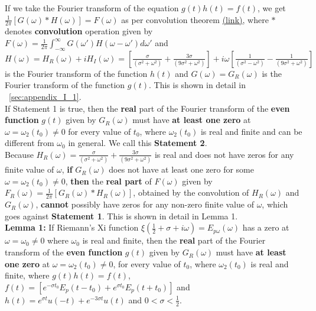 \documentclass[11pt]{elsarticle}
\begin{document}
If we take the Fourier transform of the equation $g(t)  h(t) = f(t)$, we get $ \frac{1}{2 \pi}  [ G(\omega) \ast H(\omega)] = F(\omega)$ as per convolution theorem \href{https://mathworld.wolfram.com/ConvolutionTheorem.html}{(link)}, where $\ast$ denotes \textbf{convolution} operation given by $F(\omega) =  \frac{1}{2 \pi} \int_{-\infty}^{\infty} G(\omega') H(\omega - \omega') d\omega'$ and $H(\omega)=  H_{R}(\omega) + i H_{I}(\omega) = [ \frac{\sigma}{(\sigma^{2} + \omega^{2})} + \frac{3 \sigma}{(9 \sigma^{2} + \omega^{2})} ] + i \omega [ \frac{1}{(\sigma^{2} - \omega^{2})} - \frac{1}{(9 \sigma^{2} + \omega^{2})}  ]  $ is the Fourier transform of the function $h(t)$ and $G(\omega)=  G_{R}(\omega) $ is the Fourier transform of the function $g(t)$. This is shown in detail in ~\ref{sec:appendix_I_1}. \\


If Statement 1 is true, then the \textbf{real} part of the Fourier transform of the \textbf{even function} $g(t)$  given by $G_{R}(\omega)$ must have \textbf{at least one zero} at $\omega = \omega_{2}(t_0) \neq 0$ for every value of $t_0$, where $\omega_{2}(t_0)$ is real and finite and can be different from $\omega_0$ in general. We call this \textbf{Statement 2}. \\

Because $H_R(\omega) = \frac{\sigma}{(\sigma^{2} + \omega^{2})} + \frac{3 \sigma}{(9 \sigma^{2} + \omega^{2})}$ is real and does not have zeros for any finite value of $\omega$, \textbf{if} $G_{R}(\omega)$ does not have at least one zero for some $\omega  = \omega_{2}(t_0) \neq 0$, \textbf{then} the \textbf{real part} of $F(\omega)$ given by $F_{R}(\omega)= \frac{1}{2 \pi}  [ G_{R}(\omega) \ast H_R(\omega)]$, obtained by the convolution of $H_R(\omega)$ and $G_{R}(\omega)$, \textbf{cannot} possibly have zeros for any non-zero finite value of $\omega$, which goes against \textbf{Statement 1}. This is shown in detail in Lemma 1. \\


\textbf{Lemma 1:} If Riemann's Xi function $\xi(\frac{1}{2} + \sigma + i \omega)= E_{p\omega}(\omega)$ has a zero at $\omega = \omega_{0} \neq 0$ where $\omega_{0}$ is real and finite, then the \textbf{real} part of the Fourier transform of the \textbf{even function} $g(t) $  given by $G_{R}(\omega)$  must have \textbf{at least one zero} at $\omega = \omega_{2}(t_0) \neq 0$, for every value of $t_0$, where $\omega_{2}(t_0)$ is real and finite, where $g(t) h(t) = f(t)$,  $f(t)=[ e^{-\sigma t_0} E_p(t - t_0) +  e^{\sigma t_0} E_p(t + t_0) ]$ and $h(t)= e^{ \sigma t} u(-t) + e^{ -3 \sigma t} u(t) $ and $0 < \sigma < \frac{1}{2}$.\\
\end{document}

